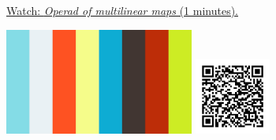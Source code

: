 
\begin{minipage}{10cm}
    \href{https://act4e-spring21.netlify.app/videos/spring2021-operads-a:operad-multilin-maps.html}{Watch: \emph{Operad of multilinear maps} (1 minutes).}
        
    \href{https://act4e-spring21.netlify.app/videos/spring2021-operads-a:operad-multilin-maps.html}{\includegraphics[height=3.5cm]{spring2021-operads-a:operad-multilin-maps/thumbnails.jpg}}
    \href{https://act4e-spring21.netlify.app/videos/spring2021-operads-a:operad-multilin-maps.html}{\includegraphics[height=2.5cm]{spring2021-operads-a:operad-multilin-maps/qrcode.png}}
\end{minipage}
